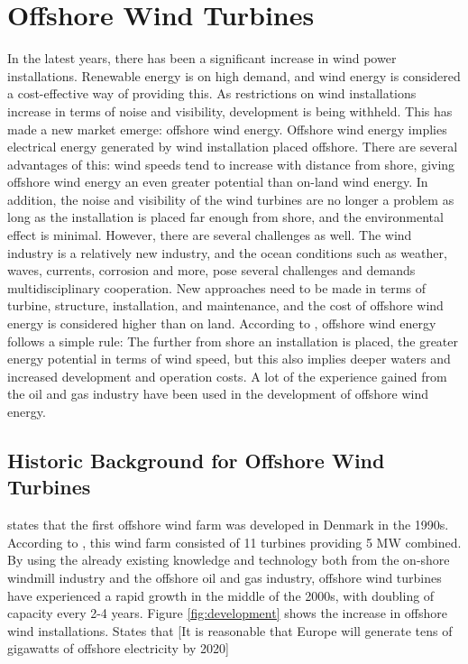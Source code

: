 \section{Offshore Wind Turbines}
In the latest years, there has been a significant increase in wind power installations. Renewable energy is on high demand, and wind energy is considered a cost-effective way of providing this. As restrictions on wind installations increase in terms of noise and visibility, development is being withheld. This has made a new market emerge: offshore wind energy. Offshore wind energy implies electrical energy generated by wind installation placed offshore.  There are several advantages of this: wind speeds tend to increase with distance from shore, giving offshore wind energy an even greater potential than on-land wind energy. In addition, the noise and visibility of the wind turbines are no longer a problem as long as the installation is placed far enough from shore, and the environmental effect is minimal. However, there are several challenges as well. The wind industry is a relatively new industry, and the ocean conditions such as weather, waves, currents, corrosion and more, pose several challenges and demands multidisciplinary cooperation. New approaches need to be made in terms of turbine, structure, installation, and maintenance, and the cost of offshore wind energy is considered higher than on land. According to \cite{Kapsali2012}, offshore wind energy follows a simple rule: The further from shore an installation is placed, the greater energy potential in terms of wind speed, but this also implies deeper waters and increased development and operation costs. A lot of the experience gained from the oil and gas industry have been used in the development of offshore wind energy. 

\subsection{Historic Background for Offshore Wind Turbines}
\cite{NG2016} states that the first offshore wind farm was developed in Denmark in the 1990s. According to \cite{Lynn2011}, this wind farm consisted of 11 turbines providing 5 MW combined.  By using the already existing knowledge and technology both from the on-shore windmill industry and the offshore oil and gas industry, offshore wind turbines have experienced a rapid growth in the middle of the 2000s, with doubling of capacity every 2-4 years. \cite{NG2016} Figure \ref{fig:development} shows the increase in offshore wind installations. \cite{Lynn2011} States that [It is reasonable that Europe will generate tens of gigawatts of offshore electricity by 2020]


